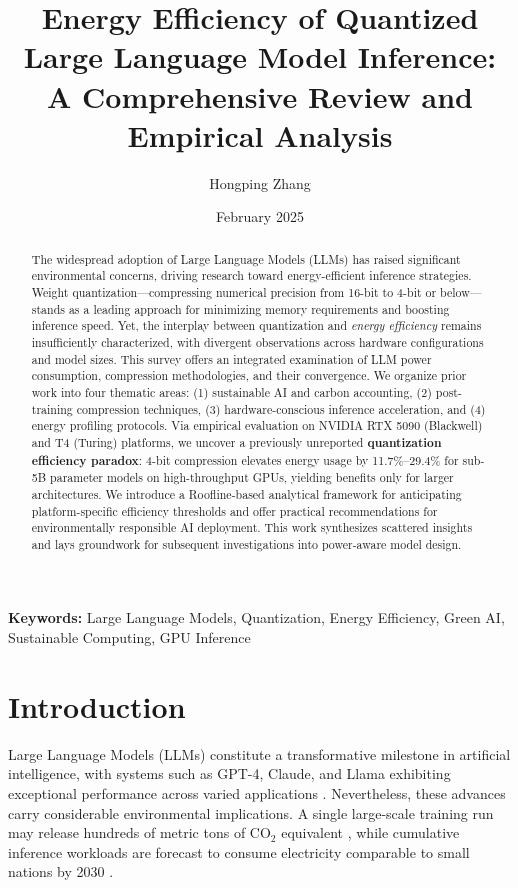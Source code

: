 \documentclass[11pt]{article}
\title{\textbf{\Large Energy Efficiency of Quantized Large Language Model Inference: A Comprehensive Review and Empirical Analysis}}
\author[1]{Hongping Zhang}
\affil[1]{Independent Researcher, China}
\date{February 2025}
\begin{document}
\maketitle

\begin{abstract}
The widespread adoption of Large Language Models (LLMs) has raised significant environmental concerns, driving research toward energy-efficient inference strategies. Weight quantization---compressing numerical precision from 16-bit to 4-bit or below---stands as a leading approach for minimizing memory requirements and boosting inference speed. Yet, the interplay between quantization and \textit{energy efficiency} remains insufficiently characterized, with divergent observations across hardware configurations and model sizes. This survey offers an integrated examination of LLM power consumption, compression methodologies, and their convergence. We organize prior work into four thematic areas: (1) sustainable AI and carbon accounting, (2) post-training compression techniques, (3) hardware-conscious inference acceleration, and (4) energy profiling protocols. Via empirical evaluation on NVIDIA RTX 5090 (Blackwell) and T4 (Turing) platforms, we uncover a previously unreported \textbf{quantization efficiency paradox}: 4-bit compression elevates energy usage by 11.7\%--29.4\% for sub-5B parameter models on high-throughput GPUs, yielding benefits only for larger architectures. We introduce a Roofline-based analytical framework for anticipating platform-specific efficiency thresholds and offer practical recommendations for environmentally responsible AI deployment. This work synthesizes scattered insights and lays groundwork for subsequent investigations into power-aware model design.
\end{abstract}

\vspace{0.5cm}
\noindent\textbf{Keywords:} Large Language Models, Quantization, Energy Efficiency, Green AI, Sustainable Computing, GPU Inference

\section{Introduction}

Large Language Models (LLMs) constitute a transformative milestone in artificial intelligence, with systems such as GPT-4, Claude, and Llama exhibiting exceptional performance across varied applications \cite{brown2020language, touvron2023llama}. Nevertheless, these advances carry considerable environmental implications. A single large-scale training run may release hundreds of metric tons of CO$_2$ equivalent \cite{strubell2019energy, patterson2021carbon}, while cumulative inference workloads are forecast to consume electricity comparable to small nations by 2030 \cite{desislavov2023compute}.
\end{document}
